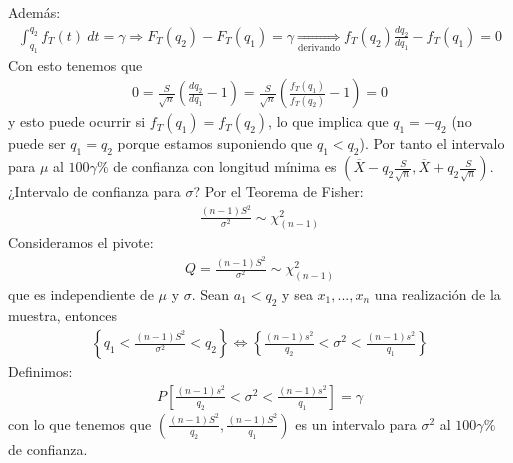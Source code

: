 \begin{ejemplo}
Además:
\begin{align*}
    \int_{q_1}^{q_2}{f_T(t) \ dt} = \gamma \Longrightarrow F_T(q_2) - F_T(q_1) = \gamma \underset{\text{derivando}}{\Longrightarrow} f_T(q_2)\frac{d q_2}{d q_1} - f_T(q_1) = 0
\end{align*}
Con esto tenemos que
\begin{align*}
    0 = \frac{S}{\sqrt{n}}\left( \frac{d q_2}{d q_1} -1 \right) = \frac{S}{\sqrt{n}}\left( \frac{f_T(q_1)}{f_T(q_2)} -1 \right) = 0
\end{align*}
y esto puede ocurrir si $f_T(q_1) = f_T(q_2)$, lo que implica que $q_1 = -q_2$ (no puede ser $q_1 = q_2$ porque estamos suponiendo que $q_1 < q_2$). Por tanto el intervalo para $\mu$ al $100 \gamma \%$ de confianza con longitud mínima es $\left(\overline{X} - q_2 \frac{S}{\sqrt{n}} , \overline{X} +q_2\frac{S}{\sqrt{n}}\right)$.
\\
\newline
¿Intervalo de confianza para $\sigma$? Por el Teorema de Fisher:
\begin{align*}
    \frac{(n-1)S^2}{\sigma^2} \sim \chi^2_{(n-1)}
\end{align*}
Consideramos el pivote:
\begin{align*}
    Q = \frac{(n-1)S^2}{\sigma^2} \sim \chi^2_{(n-1)}
\end{align*}
que es independiente de $\mu$ y $\sigma$. Sean $a_1 < q_2$ y sea $x_1,...,x_n$ una realización de la muestra, entonces
\begin{align*}
    \left\{ q_1 < \frac{(n-1)S^2}{\sigma^2} < q_2\right\} \Longleftrightarrow \left\{ \frac{(n-1)s^2}{q_2} < \sigma^2 < \frac{(n-1)s^2}{q_1} \right\}
\end{align*}
Definimos:
\begin{align*}
    P\left[ \frac{(n-1)s^2}{q_2} < \sigma^2 < \frac{(n-1)s^2}{q_1} \right] = \gamma
\end{align*}
con lo que tenemos que $\left(\frac{(n-1)S^2}{q_2}, \frac{(n-1)S^2}{q_1}\right)$ es un intervalo para $\sigma^2$ al $100\gamma \%$ de confianza.
\end{ejemplo}

